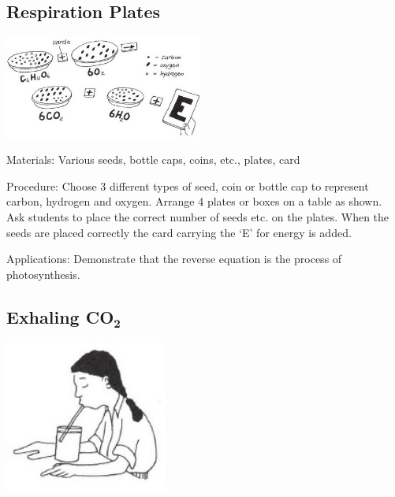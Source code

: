 \begin{multicols}{2}
\subsection{Respiration Plates}

\begin{center}
\includegraphics[width=0.49\textwidth]{./img/vso/respiration-plates.jpg}
\end{center}

\begin{description*}
\item[Materials:]{Various seeds, bottle caps, coins, etc., plates, card}
\item[Procedure:]{Choose 3 different types of seed, coin or bottle cap to represent carbon,
hydrogen and oxygen. Arrange 4 plates or boxes on a table as shown.
Ask students to place the correct number of seeds etc. on the plates.
When the seeds are placed correctly the card carrying the `E' for energy
is added.}
\item[Applications:]{Demonstrate that the reverse equation is the process of
photosynthesis.}
\end{description*}

\subsection{Exhaling \textbf{CO}$_\textbf{2}$}  %

\begin{center}
\includegraphics[width=0.4\textwidth]{./img/vso/exhale-co2.jpg}
\end{center}


\end{multicols}

